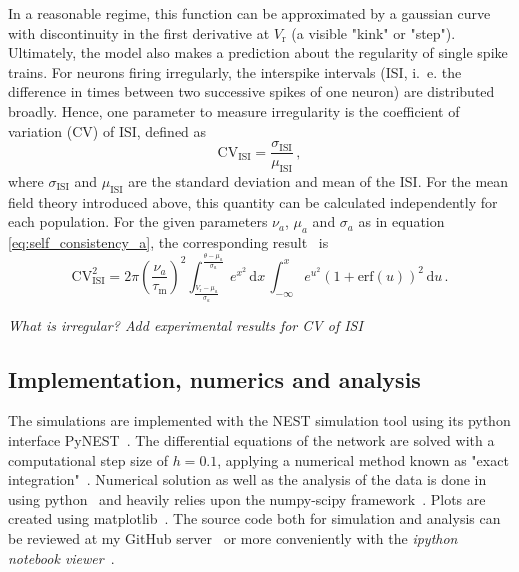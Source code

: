 In a reasonable regime, this function can be approximated by a gaussian curve with discontinuity in the first 
derivative at $V_\text{r}$ (a visible "kink" or "step").
Ultimately, the model also makes a prediction about the regularity of single spike 
trains. For neurons firing irregularly, the interspike intervals
(ISI, i.~e. the difference in times between two successive spikes of one neuron) 
are distributed broadly. Hence, one parameter to measure irregularity is the coefficient 
of variation (CV) of ISI, defined as
\begin{equation}
    \text{CV}_\text{ISI} = \frac{\sigma_\text{ISI}}{\mu_\text{ISI}} \,,
    \label{eq:cv_isi}
\end{equation}
where $\sigma_\text{ISI}$ and $\mu_\text{ISI}$ are the standard deviation and mean of 
the ISI. For the mean field theory introduced above, this quantity can be calculated
independently for each population. For the given parameters $\nu_a$, $\mu_a$ and 
$\sigma_a$ as in equation \eqref{eq:self_consistency_a}, the corresponding 
result~\cite{brunel2000} is
\begin{equation}
    \text{CV}_\text{ISI}^2 
        = 2 \pi \left(\frac{\nu_a}{\tau_\text{m}}\right)^2
            \int_{\frac{V_\text{r} - \mu_{a}}{\sigma_{a}}}^{\frac{\theta - \mu_{a}}{\sigma_{a}}} 
            e^{x^2}  \,\text{d}x  \,
            \int_{-\infty}^{x} 
            e^{u^2} \left(1 + \text{erf}(u)\right)^2 \,\text{d}u  \,.
    \label{eq:CV_ISI_mf}
\end{equation}

\emph{What is irregular? Add experimental results for CV of ISI}

\subsection{Implementation, numerics and analysis}
\label{subsec:analysis}
The simulations are implemented with the NEST simulation tool using its python interface
PyNEST~\cite{NEST}. The differential equations of the network are solved with a computational 
step size of $h=0.1$, applying a numerical method known as "exact integration"~\cite{rotter1999exact}.
Numerical solution as well as the analysis of the data is done in using 
python~\cite{python} and heavily relies upon the numpy-scipy framework~\cite{scipy}. 
Plots are created using matplotlib~\cite{matplotlib}.
The source code both for simulation and analysis can be reviewed at my
GitHub server~\cite{ba_github} or more conveniently with the 
\textit{ipython notebook viewer}~\cite{notebook_viewer}.

